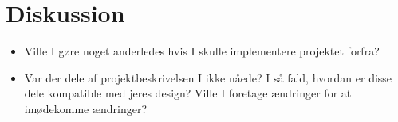 \documentclass{article}
\theoremstyle{mytheoremstyle}
\theoremstyle{mytheoremstyle}
\theoremstyle{myproblemstyle}
\begin{document}

\section{Diskussion}\label{sec:Diskussion} %



\begin{itemize}
  \item Ville I gøre noget anderledes hvis I skulle implementere projektet
  forfra?
  \item Var der dele af projektbeskrivelsen I ikke nåede? I så fald, hvordan er
  disse dele kompatible med jeres design? Ville I foretage ændringer for at
  imødekomme ændringer?
\end{itemize}

\newpage
\printbibliography
\end{document}
